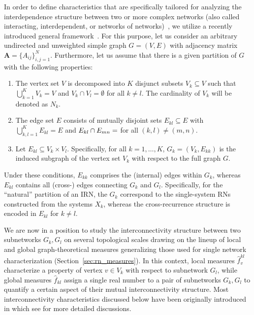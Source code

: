 In order to define characteristics that are specifically tailored for analyzing the interdependence structure between two or more complex networks (also called interacting, interdependent, or networks of networks)~\cite{Buldyrev2010}, we utilize a recently introduced general framework~\cite{Donges2011EPJB,Wiedermann2013}. For this purpose, let us consider an arbitrary undirected and unweighted simple graph $G=(V,E)$ with adjacency matrix $\textbf{A}=\{A_{ij}\}_{i,j=1}^N$. Furthermore, let us assume that there is a given partition of $G$ with the following properties:
\begin{enumerate}
\item The vertex set $V$ is decomposed into $K$ disjunct subsets $V_k \subseteq V$ such that $\bigcup_{k=1}^K V_k = V$ and $V_k \cap V_l = \emptyset$ for all $k \neq l$. The cardinality of $V_k$ will be denoted as $N_k$. 
\item The edge set $E$ consists of mutually disjoint sets $E_{kl} \subseteq E$ with $\bigcup_{k,l=1}^K E_{kl} = E$ and $E_{kl} \cap E_{mn}=\empty$ for all $(k,l) \neq (m,n)$.
\item Let $E_{kl}\subseteq V_k\times V_l$. Specifically, for all $k=1,\dots,K$, $G_k=(V_k,E_{kk})$ is the induced subgraph of the vertex set $V_k$ with respect to the full graph $G$.
\end{enumerate}
\noindent
Under these conditions, $E_{kk}$ comprises the (internal) edges within $G_k$, whereas $E_{kl}$ contains all (cross-) edges connecting $G_k$ and $G_l$. Specifically, for the ``natural'' partition of an IRN, the $G_k$ correspond to the single-system RNs constructed from the systems $X_k$, whereas the cross-recurrence structure is encoded in $E_{kl}$ for $k \neq l$.


We are now in a position to study the interconnectivity structure between two subnetworks $G_k, G_l$ on several topological scales drawing on the lineup of local and global graph-theoretical measures generalizing those used for single network characterization (Section~\ref{sec:rn_measures}). In this context, local measures $\hat{f}_v^{kl}$ characterize a property of vertex $v \in V_k$ with respect to subnetwork $G_l$, while global measures $\hat{f}_{kl}$ assign a single real number to a pair of subnetworks $G_k, G_l$ to quantify a certain aspect of their mutual interconnectivity structure. Most interconnectivity characteristics discussed below have been originally introduced in \cite{Donges2011EPJB} which see for more detailed discussions.

